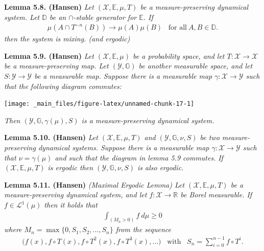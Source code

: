 \documentclass[
]{book}
\begin{document}
\textbf{Lemma 5.8. (Hansen)} \emph{Let \((\mathcal{X},\mathbb{E},\mu,T)\) be a measure-preserving dynamical system. Let \(\mathbb{D}\) be an \(\cap\)-stable generator for \(\mathbb{E}\). If}
\begin{align*}
        \mu(A\cap T^{-n}(B))\to \mu(A)\mu(B)\hspace{10pt}\text{for all}\ A,B\in\mathbb{D}.\tag{5.10}
\end{align*}
\emph{then the system is mixing. (and ergodic)}

\textbf{Lemma 5.9. (Hansen)} \emph{Let \((\mathcal{X},\mathbb{E},\mu)\) be a probability space, and let \(T : \mathcal{X}\to \mathcal{X}\) be a measure-preserving map. Let \((\mathcal{Y},\mathbb{G})\) be another measurable space, and let \(S : \mathcal{Y} \to \mathcal{Y}\) be a measurable map.}
\emph{Suppose there is a measurable map \(\gamma : \mathcal{X}\to \mathcal{Y}\) such that the following diagram commutes:}

\begin{center}\texttt{[image: \_main\_files/figure-latex/unnamed-chunk-17-1]} \end{center}

\emph{Then \((\mathcal{Y},\mathbb{G},\gamma(\mu),S)\) is a measure-preserving dynamical system.}

\textbf{Lemma 5.10. (Hansen)} \emph{Let \((\mathcal{X},\mathbb{E},\mu,T)\) and \((\mathcal{Y},\mathbb{G},\nu,S)\) be two measure-preserving dynamical systems. Suppose there is a measurable map \(\gamma : \mathcal{X}\to\mathcal{Y}\) such that \(\nu =\gamma(\mu)\) and such that the diagram in lemma 5.9 commutes.}
\emph{If \((\mathcal{X},\mathbb{E},\mu,T)\) is ergodic then \((\mathcal{Y},\mathbb{G},\nu,S)\) is also ergodic.}

\textbf{Lemma 5.11. (Hansen)} \emph{(Maximal Ergodic Lemma) Let \((\mathcal{X},\mathbb{E},\mu,T)\) be a measure-preserving dynamical system, and let \(f : \mathcal{X}\to \mathbb{R}\) be Borel measurable. If \(f\in \mathcal{L}^1(\mu)\) then it holds that}
\begin{align*}
    \int_{(M_n>0)}f\ d\mu\ge 0\tag{5.14}
\end{align*}
\emph{where \(M_n=\max\{0,S_1,S_2,...,S_n\}\) from the sequence}
\begin{align*}
    \Big(f(x), f\circ T(x),f\circ T^2(x),f\circ T^3(x),...\Big)\hspace{10pt}\text{with}\hspace{10pt}S_n=\sum_{i=0}^{n-1}f\circ T^i.
\end{align*}
\end{document}
